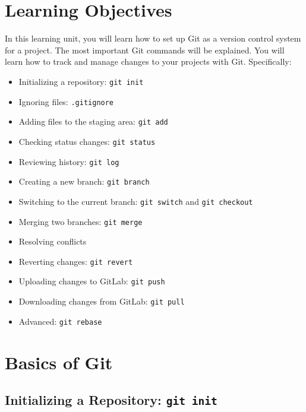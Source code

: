 \documentclass[
  letterpaper,
  DIV=11,
  numbers=noendperiod]{scrreprt}
\providecommand{\tightlist}{%
  \setlength{\itemsep}{0pt}\setlength{\parskip}{0pt}}\usepackage{longtable,booktabs,array}
\begin{document}
\hypertarget{learning-objectives}{%
\section{Learning Objectives}\label{learning-objectives}}

In this learning unit, you will learn how to set up Git as a version
control system for a project. The most important Git commands will be
explained. You will learn how to track and manage changes to your
projects with Git. Specifically:

\begin{itemize}
\tightlist
\item
  Initializing a repository: \texttt{git\ init}
\item
  Ignoring files: \texttt{.gitignore}
\item
  Adding files to the staging area: \texttt{git\ add}
\item
  Checking status changes: \texttt{git\ status}
\item
  Reviewing history: \texttt{git\ log}
\item
  Creating a new branch: \texttt{git\ branch}
\item
  Switching to the current branch: \texttt{git\ switch} and
  \texttt{git\ checkout}
\item
  Merging two branches: \texttt{git\ merge}
\item
  Resolving conflicts
\item
  Reverting changes: \texttt{git\ revert}
\item
  Uploading changes to GitLab: \texttt{git\ push}
\item
  Downloading changes from GitLab: \texttt{git\ pull}
\item
  Advanced: \texttt{git\ rebase}
\end{itemize}

\hypertarget{basics-of-git}{%
\section{Basics of Git}\label{basics-of-git}}

\hypertarget{initializing-a-repository-git-init}{%
\subsection{\texorpdfstring{Initializing a Repository:
\texttt{git\ init}}{Initializing a Repository: git init}}\label{initializing-a-repository-git-init}}
\end{document}
